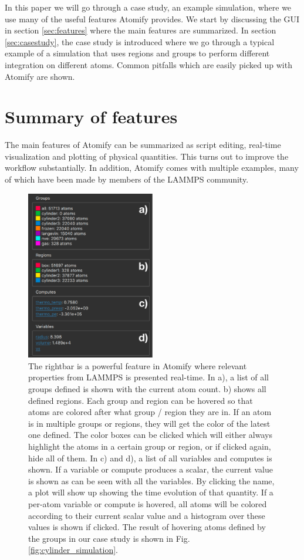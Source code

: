 \documentclass[aps,pre,twocolumn,letterpaper,floatfix,nofootinbib]{revtex4}
\begin{document}
In this paper we will go through a case study, an example simulation, where we
use many of the useful features Atomify provides.
We start by discussing the GUI in section \ref{sec:features} where the main features are summarized.
In section \ref{sec:casestudy}, the case study is introduced where we go through a typical example
of a simulation that uses regions and groups to perform different integration on different atoms.
Common pitfalls which are easily picked up with Atomify are shown.

\section{\label{sec:features}Summary of features}
The main features of Atomify can be summarized as script editing,
real-time visualization and plotting of physical quantities.
This turns out to improve the workflow substantially.
In addition, Atomify comes with multiple examples,
many of which have been made by members of the LAMMPS community.

\begin{figure}
	\centering
	\includegraphics[width=0.5\textwidth]{figures/rightbar.pdf}
	\caption{
		The rightbar is a powerful feature in Atomify where relevant
		properties from LAMMPS is presented real-time.
		In a), a list of all groups defined is shown with the current atom count.
		b) shows all defined regions. Each group and region can be hovered so that atoms
		are colored after what group / region they are in. If an atom is in multiple
		groups or regions, they will get the color of the latest one defined.
		The color boxes can be clicked which will either always highlight the atoms in a certain group or region,
		or if clicked again, hide all of them.
		In c) and d), a list of all variables and computes is shown. If a variable or compute
		produces a scalar, the current value is shown as can be seen with all the variables.
		By clicking the name, a plot will show up showing the time evolution of that quantity.
		If a per-atom variable or compute is hovered, all atoms will be colored according to their
		current scalar value and a histogram over these values is shown if clicked.
		The result of hovering atoms defined by the groups in our case study is shown in Fig. \ref{fig:cylinder_simulation}.
    }
	\label{fig:rightbar}
\end{figure}
\end{document}
